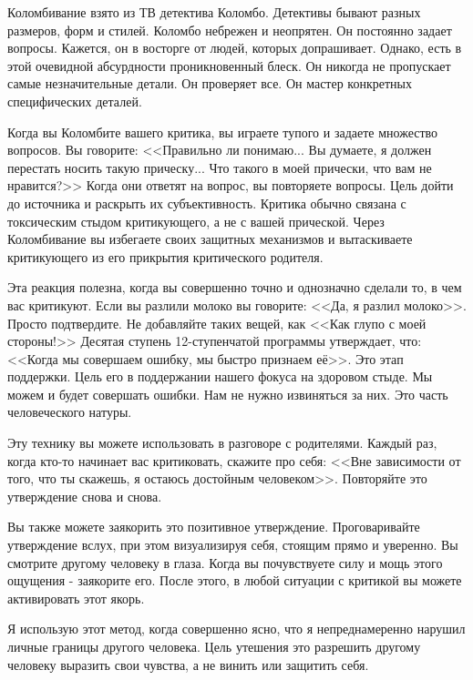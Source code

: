 \documentclass[10pt, fleqn]{article}
\begin{document}

Коломбивание взято из ТВ детектива Коломбо. Детективы бывают разных размеров, форм и стилей. Коломбо небрежен и неопрятен. Он постоянно задает вопросы. Кажется, он в восторге от людей, которых допрашивает. Однако, есть в этой очевидной абсурдности проникновенный блеск. Он никогда не пропускает самые незначительные детали. Он проверяет все. Он мастер конкретных специфических деталей.

Когда вы Коломбите вашего критика, вы играете тупого и задаете множество вопросов. Вы говорите: <<Правильно ли понимаю... Вы думаете, я должен перестать носить такую прическу... Что такого в моей прически, что вам не нравится?>> Когда они ответят на вопрос, вы повторяете вопросы. Цель дойти до источника и раскрыть их субъективность. Критика обычно связана с токсическим стыдом критикующего, а не с вашей прической. Через Коломбивание вы избегаете своих защитных механизмов и вытаскиваете критикующего из его прикрытия критического родителя.


Эта реакция полезна, когда вы совершенно точно и однозначно сделали то, в чем вас критикуют. Если вы разлили молоко вы говорите: <<Да, я разлил молоко>>. Просто подтвердите. Не добавляйте таких вещей, как <<Как глупо с моей стороны!>> Десятая ступень 12-ступенчатой программы утверждает, что: <<Когда мы совершаем ошибку, мы быстро признаем её>>. Это этап поддержки. Цель его в поддержании нашего фокуса на здоровом стыде. Мы можем и будет совершать ошибки. Нам не нужно извиняться за них. Это часть человеческого натуры. 


Эту технику вы можете использовать в разговоре с родителями. Каждый раз, когда кто-то начинает вас критиковать, скажите про себя: <<Вне зависимости от того, что ты скажешь, я остаюсь достойным человеком>>. Повторяйте это утверждение снова и снова.

Вы также можете заякорить это позитивное утверждение. Проговаривайте утверждение вслух, при этом визуализируя себя, стоящим прямо и уверенно. Вы смотрите другому человеку в глаза. Когда вы почувствуете силу и мощь этого ощущения - заякорите его. После этого, в любой ситуации с критикой вы можете активировать этот якорь.



Я использую этот метод, когда совершенно ясно, что я непреднамеренно нарушил личные границы другого человека. Цель утешения это разрешить другому человеку выразить свои чувства, а не винить или защитить себя.
\end{document}
